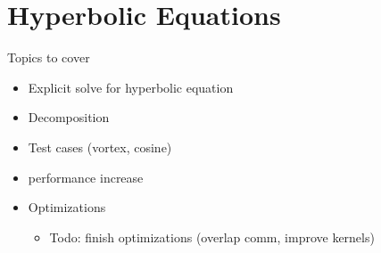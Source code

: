 \chapter{Hyperbolic Equations}

Topics to cover
\begin{itemize} 
    \item Explicit solve for hyperbolic equation
    \item Decomposition
    \item Test cases (vortex, cosine)
    \item performance increase
    \item Optimizations
    \begin{itemize} 
        \item Todo: finish optimizations (overlap comm, improve kernels) 
    \end{itemize} 
\end{itemize}
